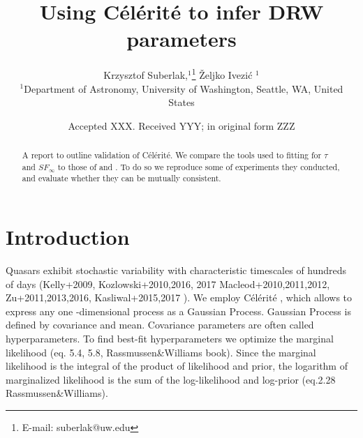 \documentclass[fleqn,usenatbib]{mnras}  %
\title[DRW fitting]{Using C\'el\'erit\'e to infer DRW parameters }
\author[K. Suberlak et al.]{
Krzysztof Suberlak,$^{1}$\thanks{E-mail: suberlak@uw.edu}
\v{Z}eljko Ivezi\'c $^{1}$
\\
$^{1}$Department of Astronomy, University of Washington, Seattle, WA, United States\\
}
\date{Accepted XXX. Received YYY; in original form ZZZ}
\begin{document}
\label{firstpage}
\pagerange{\pageref{firstpage}--\pageref{lastpage}}
\maketitle

\begin{abstract}
A report to outline validation of C\'el\'erit\'e. We compare the tools used to fitting for $\tau$ and $SF_{\infty}$ to those of 
\cite{kozlowski2017a}and \cite{macleod2011}. To do so we reproduce some of experiments they conducted, and evaluate whether they can be mutually consistent. 
\end{abstract}




\section{Introduction}
\label{sec:1}

Quasars exhibit stochastic variability with characteristic timescales of hundreds of days (Kelly+2009,  Kozlowski+2010,2016, 2017 Macleod+2010,2011,2012, Zu+2011,2013,2016, Kasliwal+2015,2017 ). We employ  C\'el\'erit\'e \citep{foreman2017} , which allows to express any one -dimensional process as a Gaussian Process.  Gaussian Process is defined by covariance and mean. Covariance parameters are often called hyperparameters. To find best-fit hyperparameters we optimize the marginal likelihood  (eq. 5.4, 5.8, Rassmussen\&Williams book). Since the marginal likelihood is the integral of  the product of likelihood and prior,  the logarithm of marginalized likelihood is the sum of the log-likelihood and log-prior (eq.2.28 Rassmussen\&Williams). 
\end{document}
